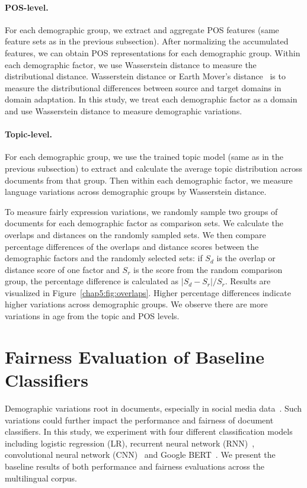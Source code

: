 \paragraph{POS-level.} For each demographic group, we extract and aggregate POS features (same feature sets as in the previous subsection). After normalizing the accumulated features, we can obtain POS representations for each demographic group. Within each demographic factor, we use Wasserstein distance to measure the distributional distance. Wasserstein distance or Earth Mover's distance~\cite{vallender1974calculation} is to measure the distributional differences between source and target domains in domain adaptation. In this study, we treat each demographic factor as a domain and use Wasserstein distance to measure demographic variations.

\paragraph{Topic-level.} For each demographic group, we use the trained topic model (same as in the previous subsection) to extract and calculate the average topic distribution across documents from that group. Then within each demographic factor, we measure language variations across demographic groups by Wasserstein distance. 


To measure fairly expression variations, we randomly sample two groups of documents for each demographic factor as comparison sets. 
We calculate the overlaps and distances on the randomly sampled sets. 
We then compare percentage differences of the overlaps and distance scores between the demographic factors and the randomly selected sets: if $S_d$ is the overlap or distance score of one factor and $S_r$ is the score from the random comparison group, the percentage difference is calculated as $|S_d - S_r|/S_r$.
Results are visualized in Figure~\ref{chap5:fig:overlaps}. 
Higher percentage differences indicate higher variations across demographic groups.
We observe there are more variations in age from the topic and POS levels.


\section{Fairness Evaluation of Baseline Classifiers}
\label{chap5:sec:fair_eval}

Demographic variations root in documents, especially in social media data~\cite{volkova2013exploring,hovy2015demographic,johannsen2015cross}.
Such variations could further impact the performance and fairness of document classifiers.
In this study, we experiment with four different classification models including logistic regression (LR), recurrent neural network (RNN)~\cite{chung2014empirical}, convolutional neural network (CNN)~\cite{kim2014convolutional} and Google BERT~\cite{devlin2019bert}.
We present the baseline results of both performance and fairness evaluations across the multilingual corpus.

